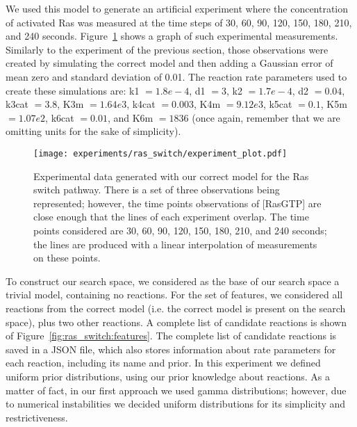 We used this model to generate an artificial experiment where the
concentration of activated Ras was measured at the time steps of 30,
60, 90, 120, 150, 180, 210, and 240 seconds.
Figure~\ref{fig:ras_switch:experimental_observations} shows a graph of
such experimental measurements. Similarly to the experiment of the 
previous section, those observations were created by simulating the 
correct model and then adding a Gaussian error of mean zero and standard
deviation of 0.01. The reaction rate parameters used to create these
simulations are: k1 $= 1.8e-4$, d1 $= 3$, k2 $= 1.7e-4$, d2 $=0.04$,
k3cat $= 3.8$, K3m $=1.64e3$, k4cat $= 0.003$, K4m $= 9.12e3$, k5cat
$= 0.1$, K5m $= 1.07e2$, k6cat $= 0.01$, and K6m $=1836$ (once again,
remember that we are omitting units for the sake of simplicity).

\begin{figure}[H]
\begin{center}
\texttt{[image: experiments/ras\_switch/experiment\_plot.pdf]}
\caption{Experimental data generated with our correct model for the Ras
    switch pathway. There is a set of three observations being
    represented; however, the time points observations of [RasGTP] are
    close enough that the lines of each experiment overlap. The time
    points considered are 30, 60, 90, 120, 150, 180, 210, and 240
    seconds; the lines are produced with a linear interpolation of
    measurements on these points.}
\label{fig:ras_switch:experimental_observations}
\end{center}
\end{figure}

To construct our search space, we considered as the base of our search
space a trivial model, containing no reactions. For the set of features,
we considered all reactions from the correct model (i.e. the correct
model is present on the search space), plus two other reactions. A
complete list of candidate reactions is shown of
Figure~\ref{fig:ras_switch:features}. The complete list of candidate
reactions is saved in a JSON file, which also stores information about
rate parameters for each reaction, including its name and prior. In this
experiment we defined uniform prior distributions, using our prior
knowledge about reactions. As a matter of fact, in our first approach we
used gamma distributions; however, due to numerical instabilities we
decided uniform distributions for its simplicity and restrictiveness.

